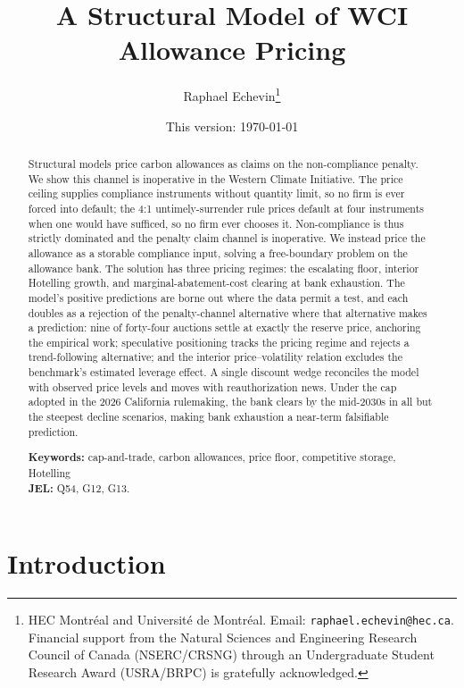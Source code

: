\documentclass[11pt,letterpaper]{article}
\title{\textbf{A Structural Model of WCI Allowance Pricing}}
\author{%
  Raphael Echevin\thanks{HEC Montr\'eal and Universit\'e de Montr\'eal.
  Email: \texttt{raphael.echevin@hec.ca}.
  Financial support from the Natural Sciences and Engineering Research Council of Canada (NSERC/CRSNG) through an Undergraduate Student Research Award (USRA/BRPC) is gratefully acknowledged.}
}
\date{This version: \today}
\theoremstyle{plain}
\theoremstyle{definition}
\numberwithin{equation}{section}
\begin{document}
\maketitle

\begin{abstract}
\noindent
Structural models price carbon allowances as claims on the non-compliance penalty. We show this channel is inoperative in the Western Climate Initiative. The price ceiling supplies compliance instruments without quantity limit, so no firm is ever forced into default; the 4:1 untimely-surrender rule prices default at four instruments when one would have sufficed, so no firm ever chooses it. Non-compliance is thus strictly dominated and the penalty claim channel is inoperative. We instead price the allowance as a storable compliance input, solving a free-boundary problem on the allowance bank. The solution has three pricing regimes: the escalating floor, interior Hotelling growth, and marginal-abatement-cost clearing at bank exhaustion. The model's positive predictions are borne out where the data permit a test, and each doubles as a rejection of the penalty-channel alternative where that alternative makes a prediction: nine of forty-four auctions settle at exactly the reserve price, anchoring the empirical work; speculative positioning tracks the pricing regime and rejects a trend-following alternative; and the interior price--volatility relation excludes the benchmark's estimated leverage effect. A single discount wedge reconciles the model with observed price levels and moves with reauthorization news. Under the cap adopted in the 2026 California rulemaking, the bank clears by the mid-2030s in all but the steepest decline scenarios, making bank exhaustion a near-term falsifiable prediction.

\medskip
\noindent\textbf{Keywords:} cap-and-trade, carbon allowances, price floor, competitive storage, Hotelling\\
\noindent\textbf{JEL:} Q54, G12, G13.
\end{abstract}

\section{Introduction}\label{sec:intro}
\end{document}
